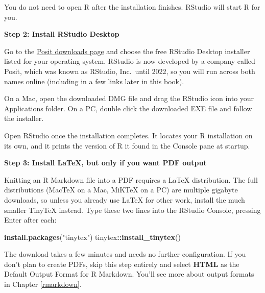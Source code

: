 \documentclass[]{tufte-book}
\newenvironment{Shaded}{\begin{snugshade}}{\end{snugshade}}
\newcommand{\FunctionTok}[1]{\textcolor[rgb]{0.13,0.29,0.53}{\textbf{#1}}}
\newcommand{\NormalTok}[1]{#1}
\newcommand{\SpecialCharTok}[1]{\textcolor[rgb]{0.81,0.36,0.00}{\textbf{#1}}}
\newcommand{\StringTok}[1]{\textcolor[rgb]{0.31,0.60,0.02}{#1}}
\begin{document}
You do not need to open R after the installation finishes. RStudio will start R for you.

\vspace*{0.2in}

\noindent\textbf{Step 2: Install RStudio Desktop}\vspace*{0.1in}

Go to the \href{https://posit.co/downloads/}{Posit downloads page} and choose the free RStudio Desktop installer listed for your operating system. RStudio is now developed by a company called Posit, which was known as RStudio, Inc.~until 2022, so you will run across both names online (including in a few links later in this book).

On a Mac, open the downloaded DMG file and drag the RStudio icon into your Applications folder. On a PC, double click the downloaded EXE file and follow the installer.

Open RStudio once the installation completes. It locates your R installation on its own, and it prints the version of R it found in the Console pane at startup.

\vspace*{0.2in}

\noindent\textbf{Step 3: Install LaTeX, but only if you want PDF output}\vspace*{0.1in}

Knitting an R Markdown file into a PDF requires a LaTeX distribution. The full distributions (MacTeX on a Mac, MiKTeX on a PC) are multiple gigabyte downloads, so unless you already use LaTeX for other work, install the much smaller TinyTeX instead. Type these two lines into the RStudio Console, pressing Enter after each:

\begin{Shaded}
\begin{Highlighting}[]
\FunctionTok{install.packages}\NormalTok{(}\StringTok{"tinytex"}\NormalTok{)}
\NormalTok{tinytex}\SpecialCharTok{::}\FunctionTok{install\_tinytex}\NormalTok{()}
\end{Highlighting}
\end{Shaded}

The download takes a few minutes and needs no further configuration. If you don't plan to create PDFs, skip this step entirely and select \textbf{HTML} as the Default Output Format for R Markdown. You'll see more about output formats in Chapter \ref{rmarkdown}.

\vspace*{0.2in}
\end{document}
